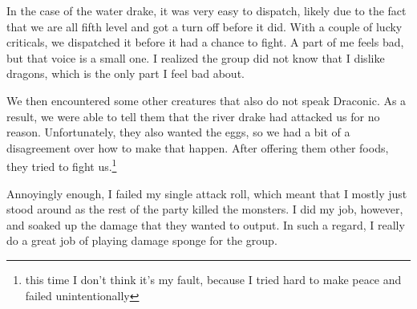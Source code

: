 \documentclass[12pt]{article}[titlepage]
\renewcommand{\,}{\textsuperscript{,}}
\begin{document}
In the case of the water drake, it was very easy to dispatch, likely due to the fact that we are all fifth level and got a turn off before it did.
With a couple of lucky criticals, we dispatched it before it had a chance to fight.
A part of me feels bad, but that voice is a small one.
I realized the group did not know that I dislike dragons, which is the only part I feel bad about.

We then encountered some other creatures that also do not speak Draconic.
As a result, we were able to tell them that the river drake had attacked us for no reason.
Unfortunately, they also wanted the eggs, so we had a bit of a disagreement over how to make that happen.
After offering them other foods, they tried to fight us.\footnote{this time I don't think it's my fault, because I tried hard to make peace and failed unintentionally}

Annoyingly enough, I failed my single attack roll, which meant that I mostly just stood around as the rest of the party killed the monsters.
I did my job, however, and soaked up the damage that they wanted to output.
In such a regard, I really do a great job of playing damage sponge for the group.
\end{document}

